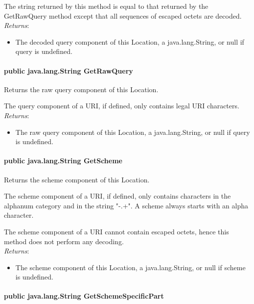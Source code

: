 \documentclass[$Date: 2003/06/26 19:29:31 $]{glabarticle}
\begin{document}
 The string returned by this method is equal to that returned by the
 GetRawQuery method except that all sequences of escaped octets are
 decoded.\\
 
 \textit{Returns}:
 \begin{itemize}
 \item[] The decoded query component of this Location, a java.lang.String, or null if query is undefined.
 \end{itemize} 
 
\paragraph{public java.lang.String GetRawQuery}

 Returns the raw query component of this Location.

 The query component of a URI, if defined, only contains legal URI  characters.\\
 
 \textit{Returns}:
 \begin{itemize}
 \item[] The raw query component of this Location, a java.lang.String, or null if query is undefined.
 \end{itemize} 
  
\paragraph{public java.lang.String GetScheme}

 Returns the scheme component of this Location.

 The scheme component of a URI, if defined, only contains characters
 in the alphanum category and in the string "-.+".  A scheme always
 starts with an alpha character.
   
 The scheme component of a URI cannot contain escaped octets, hence
 this method does not perform any decoding.\\

 \textit{Returns}:
 \begin{itemize}
 \item[] The scheme component of this Location, a java.lang.String, or null if scheme is undefined.
 \end{itemize} 
    
\paragraph{public java.lang.String GetSchemeSpecificPart}
\end{document}

